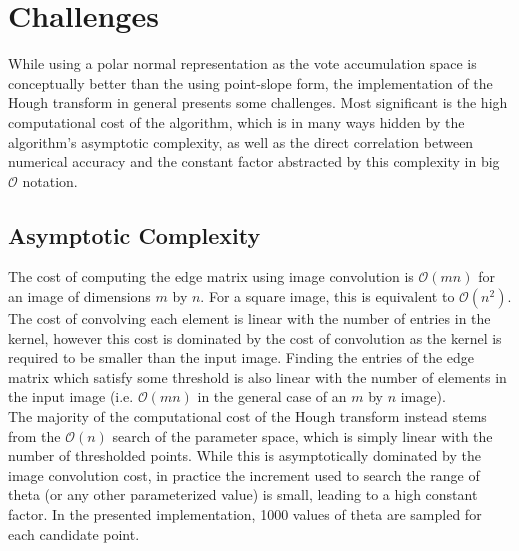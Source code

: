 \documentclass[letterpaper,12pt]{article}
\begin{document}
\section{Challenges}
\label{sec:chal}
While using a polar normal representation as the vote accumulation space is
conceptually better than the using point-slope form, the implementation of
the Hough transform in general presents some challenges. Most significant is
the high computational cost of the algorithm, which is in many ways hidden by
the algorithm's asymptotic complexity, as well as the direct correlation between
numerical accuracy and the constant factor abstracted by this complexity in
big $\mathcal{O}$ notation.

\subsection{Asymptotic Complexity}
The cost of computing the edge matrix using image convolution is $\mathcal{O}(mn)$ for
an image of dimensions $m$ by $n$. For a square image, this is equivalent to $\mathcal{O}(n^{2})$.
The cost of convolving each element is linear with the number of entries in the kernel, however
this cost is dominated by the cost of convolution as the kernel is required to be smaller than
the input image. Finding the entries of the edge matrix which satisfy some threshold is also linear with
the number of elements in the input image (i.e. $\mathcal{O}(mn)$ in the general case of an $m$
by $n$ image).
\\
The majority of the computational cost of the Hough transform instead stems from the
$\mathcal{O}(n)$ search of the parameter space, which is simply linear with the number of
thresholded points. While this is asymptotically dominated by the image convolution cost,
in practice the increment used to search the range of theta (or any other parameterized value)
is small, leading to a high constant factor. In the presented implementation, 1000 values of
theta are sampled for each candidate point.
\end{document}
